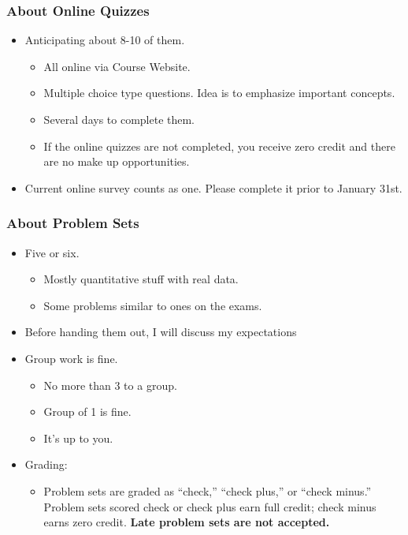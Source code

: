 \documentclass[9pt]{beamer}
\begin{document}
\begin{frame}[t]
\frametitle{About Online Quizzes}
\begin{itemize}
\item Anticipating about 8-10 of them.
\begin{itemize}
\medskip
\item All online via Course Website.
\medskip
\item Multiple choice type questions. Idea is to emphasize important concepts.
\medskip
\item Several days to complete them.
\medskip
\item If the online quizzes are not completed, you receive zero credit and there are no make up opportunities.
\end{itemize}
\bigskip
\item Current online survey counts as one. Please complete it prior to January 31st.
\bigskip
\end{itemize}
\end{frame}


\begin{frame}[t]
\frametitle{About Problem Sets}
\begin{itemize}
\item Five or six.
\begin{itemize}
\medskip
\item Mostly quantitative stuff with real data.
\medskip
\item Some problems similar to ones on the exams.
\end{itemize}
\bigskip
\item Before handing them out, I will discuss my expectations
\bigskip
\item Group work is fine.
\begin{itemize}
\medskip
\item No more than 3 to a group.
\medskip
\item Group of 1 is fine.
\medskip
\item It's up to you.
\end{itemize}
\bigskip
\item Grading:
\begin{itemize}
\medskip
\item Problem sets are graded as ``check,'' ``check plus,'' or ``check minus.'' Problem sets scored check or check plus earn full credit; check minus earns zero credit. \textbf{Late problem sets are not accepted.}
\end{itemize}
\end{itemize}
\end{frame}
\end{document}
